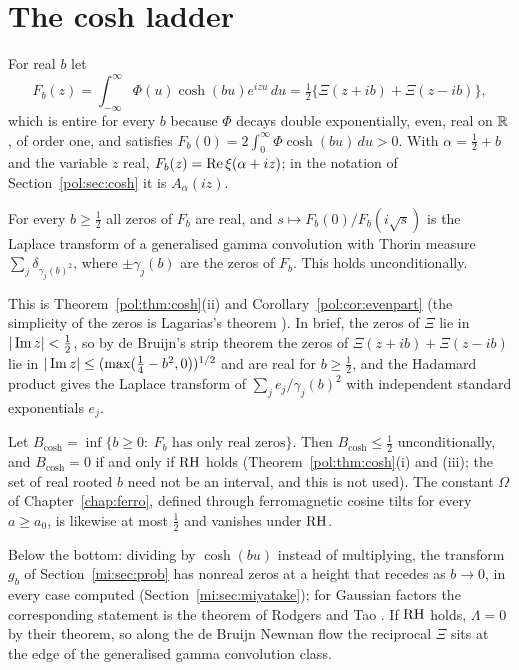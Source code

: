 \section{The cosh ladder}\label{mi:sec:ladder}

For real $b$ let
\begin{equation}\label{mi:eq:Fb}
F_b(z)=\int_{-\infty}^\infty\Phi(u)\cosh(bu)e^{izu}\,du=\tfrac12\big\{\Xi(z+ib)+\Xi(z-ib)\big\},
\end{equation}
which is entire for every $b$ because $\Phi$ decays double exponentially, even, real on $\mathbb{R}$, of order one, and satisfies $F_b(0)=2\int_0^\infty\Phi\cosh(bu)\,du>0$. With $\alpha=\frac12+b$ and the variable $z$ real, $F_b(z)=\operatorname{Re}\xi(\alpha+iz)$; in the notation of Section~\ref{pol:sec:cosh} it is $A_\alpha(iz)$.

\begin{theorem}\label{mi:thm:ladder}
For every $b\ge\frac12$ all zeros of $F_b$ are real, and $s\mapsto F_b(0)/F_b(i\sqrt s)$ is the Laplace transform of a generalised gamma convolution with Thorin measure $\sum_j\delta_{\gamma_j(b)^2}$, where $\pm\gamma_j(b)$ are the zeros of $F_b$. This holds unconditionally.
\end{theorem}

This is Theorem~\ref{pol:thm:cosh}(ii) and Corollary~\ref{pol:cor:evenpart} (the simplicity of the zeros is Lagarias's theorem \cite{Lagarias05}). In brief, the zeros of $\Xi$ lie in $|\operatorname{Im} z|<\frac12$, so by de Bruijn's strip theorem \cite{deBruijn} the zeros of $\Xi(z+ib)+\Xi(z-ib)$ lie in $|\operatorname{Im} z|\le(\max(\frac14-b^2,0))^{1/2}$ and are real for $b\ge\frac12$, and the Hadamard product gives the Laplace transform of $\sum_je_j/\gamma_j(b)^2$ with independent standard exponentials $e_j$.

Let $B_{\cosh}=\inf\{b\ge0:\ F_b\text{ has only real zeros}\}$. Then $B_{\cosh}\le\frac12$ unconditionally, and $B_{\cosh}=0$ if and only if $\mathrm{RH}$ holds (Theorem~\ref{pol:thm:cosh}(i) and (iii); the set of real rooted $b$ need not be an interval, and this is not used). The constant $\Omega$ of Chapter~\ref{chap:ferro}, defined through ferromagnetic cosine tilts for every $a\ge a_0$, is likewise at most $\frac12$ and vanishes under $\mathrm{RH}$.

Below the bottom: dividing by $\cosh(bu)$ instead of multiplying, the transform $g_b$ of Section~\ref{mi:sec:prob} has nonreal zeros at a height that recedes as $b\to0$, in every case computed (Section~\ref{mi:sec:miyatake}); for Gaussian factors the corresponding statement is the theorem of Rodgers and Tao \cite{RodgersTao}. If $\mathrm{RH}$ holds, $\Lambda=0$ by their theorem, so along the de Bruijn Newman flow the reciprocal $\Xi$ sits at the edge of the generalised gamma convolution class.

